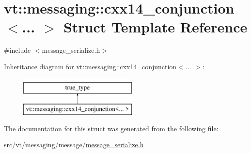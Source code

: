 \hypertarget{structvt_1_1messaging_1_1cxx14__conjunction}{}\section{vt\+:\+:messaging\+:\+:cxx14\+\_\+conjunction$<$... $>$ Struct Template Reference}
\label{structvt_1_1messaging_1_1cxx14__conjunction}


{\ttfamily \#include $<$message\+\_\+serialize.\+h$>$}

Inheritance diagram for vt\+:\+:messaging\+:\+:cxx14\+\_\+conjunction$<$... $>$\+:\begin{figure}[H]
\begin{center}
\leavevmode
\includegraphics[height=2.000000cm]{structvt_1_1messaging_1_1cxx14__conjunction}
\end{center}
\end{figure}


The documentation for this struct was generated from the following file\+:\begin{DoxyCompactItemize}
\item 
src/vt/messaging/message/\hyperlink{message__serialize_8h}{message\+\_\+serialize.\+h}\end{DoxyCompactItemize}
